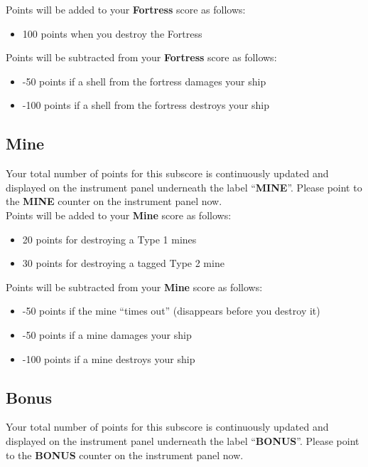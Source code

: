 \documentclass[letterpaper,12pt]{article}
\begin{document}
\noindent
Points will be added to your \textbf{Fortress} score as follows:
\begin{itemize}
\item 100 points when you destroy the Fortress
\end{itemize}

\noindent
Points will be subtracted from your \textbf{Fortress} score as follows:
\begin{itemize}
\item -50 points if a shell from the fortress damages your ship
\item -100 points if a shell from the fortress destroys your ship
\end{itemize}

\subsection{Mine}

Your total number of points for this subscore is continuously updated and displayed on
the instrument panel underneath the label ``\textbf{MINE}''. Please point to the \textbf{MINE}
counter on the instrument panel now.\\

\noindent
Points will be added to your \textbf{Mine} score as follows:
\begin{itemize}
\item 20 points for destroying a Type 1 mines
\item 30 points for destroying a tagged Type 2 mine
\end{itemize}

\noindent
Points will be subtracted from your \textbf{Mine} score as follows:
\begin{itemize}
\item -50 points if the mine ``times out'' (disappears before you destroy it)
\item -50 points if a mine damages your ship
\item -100 points if a mine destroys your ship
\end{itemize}

\subsection{Bonus}

Your total number of points for this subscore is continuously updated and displayed on
the instrument panel underneath the label ``\textbf{BONUS}''. Please point to the \textbf{BONUS}
counter on the instrument panel now.\\
\end{document}
